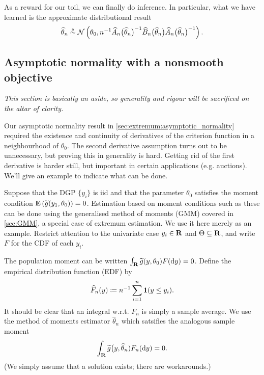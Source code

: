 \documentclass[11pt,letterpaper,reqno,oneside]{article}
\begin{document}
As a reward for our toil, we can finally do inference. In particular, what we have learned is the approximate distributional result
%
\begin{equation*}
	\widehat{\theta}_n
	\protect\overset{{\scriptscriptstyle \mathrm{a}}}{\sim} \mathcal{N}\left( \theta_0 ,
	n^{-1} \widehat{A}_n\bigl( \widehat{\theta}_n \bigr)^{-1} 
	\widehat{B}_n\bigl( \widehat{\theta}_n \bigr) 
	\widehat{A}_n\bigl( \widehat{\theta}_n \bigr)^{-1} 
	\right) .
\end{equation*}



\subsection{Asymptotic normality with a nonsmooth objective}
\label{sec:extremum:asymptotic_normality_nonsmooth}

\emph{This section is basically an aside, so generality and rigour will be sacrificed on the altar of clarity.}

Our asymptotic normality result in \cref{sec:extremum:asymptotic_normality} required the existence and continuity of derivatives of the criterion function in a neighbourhood of $\theta_0$. The second derivative assumption turns out to be unnecessary, but proving this in generality is hard. Getting rid of the first derivative is harder still, but important in certain applications (e.g. auctions). We'll give an example to indicate what can be done.

Suppose that the DGP $\{ y_i \}$ is iid and that the parameter $\theta_0$ satisfies the moment condition $\mathbf{E}\left( \widetilde{g}(y_1,\theta_0) \right) = 0$. Estimation based on moment conditions such as these can be done using the generalised method of moments (GMM) covered in \cref{sec:GMM}, a special case of extremum estimation. We use it here merely as an example. Restrict attention to the univariate case $y_i \in \mathbf{R}$ and $\Theta \subseteq \mathbf{R}$, and write $F$ for the CDF of each $y_i$.

The population moment can be written $\int_{\mathbf{R}} \widetilde{g}(y,\theta_0) F(\mathrm{d} y) = 0$. Define the empirical distribution function (EDF) by
%
\begin{equation*}
	\widehat{F}_n(y) 
	\coloneqq n^{-1} \sum_{i=1}^n \boldsymbol{1}(y \leq y_i) .
\end{equation*}
%
It should be clear that an integral w.r.t. $F_n$ is simply a sample average. We use the method of moments estimator $\widehat{\theta}_n$ which satsifies the analogous sample moment
%
\begin{equation*}
	\int_{\mathbf{R}} \widetilde{g}\bigl( y, \widehat{\theta}_n ) F_n(\mathrm{d} y) = 0 .
\end{equation*}
%
(We simply assume that a solution exists; there are workarounds.)
\end{document}
